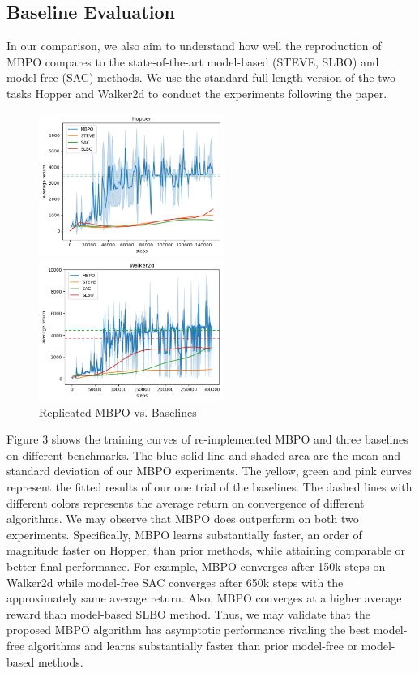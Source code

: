 \documentclass{article}
\begin{document}
\subsection{Baseline Evaluation}

In our comparison, we also aim to understand how well the reproduction of MBPO compares to the state-of-the-art model-based (STEVE, SLBO) and model-free (SAC) methods. We use the standard full-length version of the two tasks Hopper and Walker2d to conduct the experiments following the paper. 

\begin{figure}[h]
\centering
\begin{minipage}[t]{0.48\textwidth}
\centering
\includegraphics[width=6cm]{Picture1.png}
\end{minipage}
\begin{minipage}[t]{0.48\textwidth}
\centering
\includegraphics[width=6cm]{Picture2.png}
\end{minipage}
\caption{Replicated MBPO vs. Baselines}
\end{figure}

Figure 3 shows the training curves of re-implemented MBPO and three baselines on different benchmarks. The blue solid line and shaded area are the mean and standard deviation of our MBPO experiments. The yellow, green and pink curves represent the fitted results of our one trial of the baselines. The dashed lines with different colors represents the average return on convergence of different algorithms. We may observe that MBPO does outperform on both two experiments. Specifically, MBPO learns substantially faster, an order of magnitude faster on Hopper, than prior methods, while attaining comparable or better final performance. For example, MBPO converges after 150k steps on Walker2d while model-free SAC converges after 650k steps with the approximately same average return. Also, MBPO converges at a higher average reward than model-based SLBO method. Thus, we may validate that the proposed MBPO algorithm has asymptotic performance rivaling the best model-free algorithms and learns substantially faster than prior model-free or model-based methods.
\end{document}
